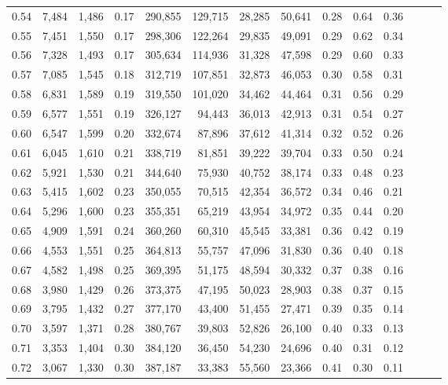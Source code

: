 \begin{tabular}{rrrrrrrrrrrrrr}
0.54 &  7,484 &  1,486 &  0.17 &  290,855 &  129,715 &  28,285 &  50,641 &  0.28 &  0.64 &      0.36 \\
0.55 &  7,451 &  1,550 &  0.17 &  298,306 &  122,264 &  29,835 &  49,091 &  0.29 &  0.62 &      0.34 \\
0.56 &  7,328 &  1,493 &  0.17 &  305,634 &  114,936 &  31,328 &  47,598 &  0.29 &  0.60 &      0.33 \\
0.57 &  7,085 &  1,545 &  0.18 &  312,719 &  107,851 &  32,873 &  46,053 &  0.30 &  0.58 &      0.31 \\
0.58 &  6,831 &  1,589 &  0.19 &  319,550 &  101,020 &  34,462 &  44,464 &  0.31 &  0.56 &      0.29 \\
0.59 &  6,577 &  1,551 &  0.19 &  326,127 &   94,443 &  36,013 &  42,913 &  0.31 &  0.54 &      0.27 \\
0.60 &  6,547 &  1,599 &  0.20 &  332,674 &   87,896 &  37,612 &  41,314 &  0.32 &  0.52 &      0.26 \\
0.61 &  6,045 &  1,610 &  0.21 &  338,719 &   81,851 &  39,222 &  39,704 &  0.33 &  0.50 &      0.24 \\
0.62 &  5,921 &  1,530 &  0.21 &  344,640 &   75,930 &  40,752 &  38,174 &  0.33 &  0.48 &      0.23 \\
0.63 &  5,415 &  1,602 &  0.23 &  350,055 &   70,515 &  42,354 &  36,572 &  0.34 &  0.46 &      0.21 \\
0.64 &  5,296 &  1,600 &  0.23 &  355,351 &   65,219 &  43,954 &  34,972 &  0.35 &  0.44 &      0.20 \\
0.65 &  4,909 &  1,591 &  0.24 &  360,260 &   60,310 &  45,545 &  33,381 &  0.36 &  0.42 &      0.19 \\
0.66 &  4,553 &  1,551 &  0.25 &  364,813 &   55,757 &  47,096 &  31,830 &  0.36 &  0.40 &      0.18 \\
0.67 &  4,582 &  1,498 &  0.25 &  369,395 &   51,175 &  48,594 &  30,332 &  0.37 &  0.38 &      0.16 \\
0.68 &  3,980 &  1,429 &  0.26 &  373,375 &   47,195 &  50,023 &  28,903 &  0.38 &  0.37 &      0.15 \\
0.69 &  3,795 &  1,432 &  0.27 &  377,170 &   43,400 &  51,455 &  27,471 &  0.39 &  0.35 &      0.14 \\
0.70 &  3,597 &  1,371 &  0.28 &  380,767 &   39,803 &  52,826 &  26,100 &  0.40 &  0.33 &      0.13 \\
0.71 &  3,353 &  1,404 &  0.30 &  384,120 &   36,450 &  54,230 &  24,696 &  0.40 &  0.31 &      0.12 \\
0.72 &  3,067 &  1,330 &  0.30 &  387,187 &   33,383 &  55,560 &  23,366 &  0.41 &  0.30 &      0.11 \\

\end{tabular}
